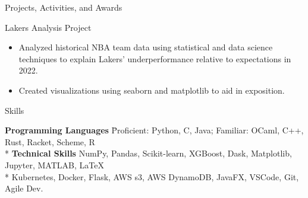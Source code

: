 \documentclass{article}
\newlength{\tabin}
\newlength{\secsep}
\newcommand{\lineunder}{\vspace*{-8pt} \\ \hspace*{-6pt} \hrulefill \\ \vspace*{-15pt}}
\newenvironment{tabbedsection}[1]{
  \begin{list}{}{
      \setlength{\itemsep}{0pt}
      \setlength{\labelsep}{0pt}
      \setlength{\labelwidth}{0pt}
      \setlength{\leftmargin}{\tabin}
      \setlength{\rightmargin}{\tabin}
      \setlength{\listparindent}{0pt}
      \setlength{\parsep}{0pt}
      \setlength{\parskip}{0pt}
      \setlength{\partopsep}{0pt}
      \setlength{\topsep}{#1}
    }
  \item[]
}{\end{list}}
\newenvironment{nospacetabbing}{
    \begin{tabbing}
}{\end{tabbing}\vspace{-1.2em}}
\newenvironment{resume_section}[1]{
  \filbreak
  \vspace{2\secsep}
  \textsc{\large#1}
  \lineunder
  \begin{tabbedsection}{\secsep}
}{\end{tabbedsection}}
\newenvironment{resume_subsection}[2][]{
  \textbf{#2} \hfill {\footnotesize #1} \hspace{-4em}
  \begin{tabbedsection}{0.5\secsep}
}{\end{tabbedsection}}
\newenvironment{subitems}{
  \renewcommand{\labelitemi}{-}
  \begin{itemize}
      \setlength{\labelsep}{1em}
}{\end{itemize}}
\begin{document}
\begin{resume_section}{Projects, Activities, and Awards}
 \begin{resume_subsection}[]{Lakers Analysis Project}
  \begin{subitems}
  	\item Analyzed historical NBA team data using statistical and data science techniques to explain Lakers' underperformance relative to expectations in 2022.
  	\item Created visualizations using seaborn and matplotlib to aid in exposition.
  \end{subitems}
  \end{resume_subsection}

  
\end{resume_section}

\begin{resume_section}{Skills}
  \begin{nospacetabbing}
  \textbf{Programming Languages} \= Proficient: Python, C, Java; Familiar: OCaml, C++, Rust, Racket, Scheme, R\\*
  \textbf{Technical Skills}  \> NumPy, Pandas, Scikit-learn, XGBoost, Dask, Matplotlib, Jupyter, MATLAB, \LaTeX \\ *
  \> Kubernetes, Docker, Flask, AWS s3, AWS DynamoDB, JavaFX, VSCode, Git, Agile Dev.

  \end{nospacetabbing}
\end{resume_section}
\end{document}

